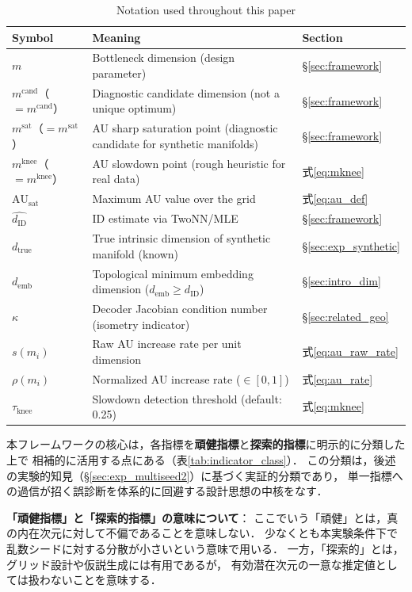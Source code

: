 \documentclass[11pt,a4paper]{jsarticle}
\newcommand{\dID}{d_{\mathrm{ID}}}
\newcommand{\dzopt}{m^{\mathrm{cand}}}
\newcommand{\dtrue}{d_{\mathrm{true}}}
\newcommand{\kap}{\kappa}
\newcommand{\AUsat}{\mathrm{AU}_{\mathrm{sat}}}
\newcommand{\dzsat}{m^{\mathrm{sat}}}
\newcommand{\mknee}{m^{\mathrm{knee}}}
\newcommand{\demb}{d_{\mathrm{emb}}}
\begin{document}
\begin{table}[H]
\centering
\caption{Notation used throughout this paper}
\label{tab:notation}
\small
\begin{tabular}{lll}
\toprule
Symbol & Meaning & Section \\
\midrule
$m$ & Bottleneck dimension (design parameter) & §\ref{sec:framework} \\
$\dzopt$（$= m^{\mathrm{cand}}$） & Diagnostic candidate dimension (not a unique optimum) & §\ref{sec:framework} \\
$\dzsat$（$= m^{\mathrm{sat}}$） & AU sharp saturation point (diagnostic candidate for synthetic manifolds) & §\ref{sec:framework} \\
$\mknee$（$= m^{\mathrm{knee}}$） & AU slowdown point (rough heuristic for real data) & 式\eqref{eq:mknee} \\
$\AUsat$ & Maximum AU value over the grid & 式\eqref{eq:au_def} \\
$\hat{\dID}$ & ID estimate via TwoNN/MLE & §\ref{sec:framework} \\
$\dtrue$ & True intrinsic dimension of synthetic manifold (known) & §\ref{sec:exp_synthetic} \\
$\demb$ & Topological minimum embedding dimension ($\demb \geq \dID$) & §\ref{sec:intro_dim} \\
$\kap$ & Decoder Jacobian condition number (isometry indicator) & §\ref{sec:related_geo} \\
$s(m_i)$ & Raw AU increase rate per unit dimension & 式\eqref{eq:au_raw_rate} \\
$\rho(m_i)$ & Normalized AU increase rate ($\in[0,1]$) & 式\eqref{eq:au_rate} \\
$\tau_{\mathrm{knee}}$ & Slowdown detection threshold (default: 0.25) & 式\eqref{eq:mknee} \\
\bottomrule
\end{tabular}
\end{table}

本フレームワークの核心は，各指標を\textbf{頑健指標}と\textbf{探索的指標}に明示的に分類した上で
相補的に活用する点にある（表\ref{tab:indicator_class}）．
この分類は，後述の実験的知見（§\ref{sec:exp_multiseed2}）に基づく実証的分類であり，
単一指標への過信が招く誤診断を体系的に回避する設計思想の中核をなす．

\textbf{「頑健指標」と「探索的指標」の意味について}：
ここでいう「頑健」とは，真の内在次元に対して不偏であることを意味しない．
少なくとも本実験条件下で乱数シードに対する分散が小さいという意味で用いる．
一方，「探索的」とは，グリッド設計や仮説生成には有用であるが，
有効潜在次元の一意な推定値としては扱わないことを意味する．
\end{document}
